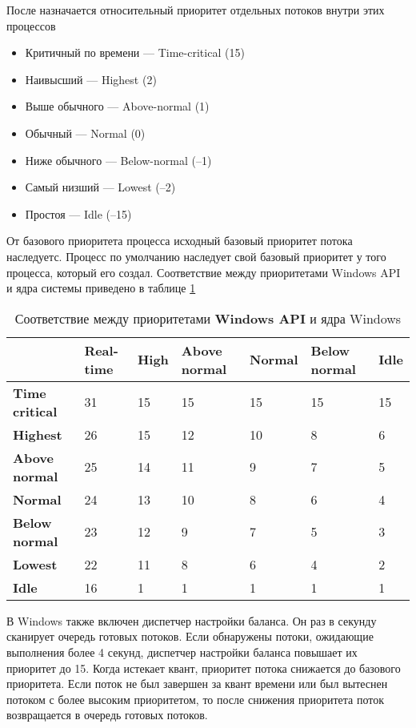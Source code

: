 После назначается относительный приоритет отдельных потоков внутри этих процессов
\begin{itemize}
	\item Критичный по времени — Time-critical (15)
	\item Наивысший — Highest (2)
	\item Выше обычного — Above-normal (1)
	\item Обычный — Normal (0)
	\item Ниже обычного — Below-normal (–1)
	\item Самый низший — Lowest (–2)
	\item Простоя — Idle (–15)
\end{itemize}

От базового приоритета процесса исходный базовый приоритет потока наследуетс. Процесс по умолчанию наследует свой базовый приоритет у того процесса, который его создал. Соответствие между приоритетами Windows API и ядра системы приведено в таблице \ref{tbl:priority}


\begin{table}[h]
	\caption{Соответствие между приоритетами \textbf{Windows API} и ядра Windows}
	\begin{center}
		\begin{tabular}{|l|p{45pt}|p{45pt}|p{45pt}|p{45pt}|p{45pt}|p{45pt}|}
			\hline
			{} & \textbf{Real-time} & \textbf{High} & \textbf{Above normal} & \textbf{Normal} & \textbf{Below normal} & \textbf{Idle}\\
			\hline
			\textbf{Time critical} & 31 & 15 & 15 & 15 & 15 & 15 \\
			\hline
			\textbf{Highest} & 26 & 15 & 12 & 10 & 8 & 6 \\
			\hline
			\textbf{Above normal} & 25 & 14 & 11 & 9 & 7 & 5 \\
			\hline
			\textbf{Normal} & 24 & 13 & 10 & 8 & 6 & 4 \\
			\hline
			\textbf{Below normal} & 23 & 12 & 9 & 7 & 5 & 3 \\
			\hline
			\textbf{Lowest} & 22 & 11 & 8 & 6 & 4 & 2 \\
			\hline
			\textbf{Idle} & 16 & 1 & 1 & 1 & 1 & 1 \\
			\hline
		\end{tabular}
	\end{center}
	\label{tbl:priority}
\end{table}

В Windows также включен диспетчер настройки баланса. Он раз в секунду сканирует очередь готовых потоков. Если обнаружены потоки, ожидающие выполнения более 4 секунд, диспетчер настройки баланса повышает их приоритет до 15. Когда истекает квант, приоритет потока снижается до базового приоритета. Если поток не был завершен за квант времени или был вытеснен потоком с более высоким приоритетом, то после снижения приоритета поток возвращается в очередь готовых потоков.

